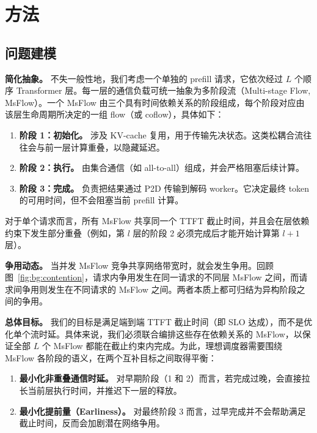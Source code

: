 \section{方法}\label{sec:Methodology}

\subsection{问题建模}\label{sec:Methodology:formulation}

\textbf{简化抽象。} 不失一般性地，我们考虑一个单独的 prefill 请求，它依次经过 $L$ 个顺序 Transformer 层。每一层的通信负载可统一抽象为多阶段流（Multi-stage Flow, MsFlow）。一个 MsFlow 由三个具有时间依赖关系的阶段组成，每个阶段对应由该层生命周期所决定的一组 flow（或 coflow），具体如下：
\begin{enumerate}[label=$\bullet$,leftmargin=*,itemsep=0.5pt]
\item \textbf{阶段 1：初始化。} 涉及 KV-cache 复用，用于传输先决状态。这类松耦合流往往会与前一层计算重叠，以隐藏延迟。
\item \textbf{阶段 2：执行。} 由集合通信（如 all-to-all）组成，并会严格阻塞后续计算。
\item \textbf{阶段 3：完成。} 负责把结果通过 P2D 传输到解码 worker。它决定最终 token 的可用时间，但不会阻塞当前 prefill 计算。
\end{enumerate}

对于单个请求而言，所有 MsFlow 共享同一个 TTFT 截止时间，并且会在层依赖约束下发生部分重叠（例如，第 $l$ 层的阶段 2 必须完成后才能开始计算第 $l+1$ 层）。

\textbf{争用动态。} 当并发 MsFlow 竞争共享网络带宽时，就会发生争用。回顾图~\ref{fig:bg:contention}，请求内争用发生在同一请求的不同层 MsFlow 之间，而请求间争用则发生在不同请求的 MsFlow 之间。两者本质上都可归结为异构阶段之间的争用。

\textbf{总体目标。} 我们的目标是满足端到端 TTFT 截止时间（即 SLO 达成），而不是优化单个流时延。具体来说，我们必须联合编排这些存在依赖关系的 MsFlow，以保证全部 $L$ 个 MsFlow 都能在截止约束内完成。为此，理想调度器需要围绕 MsFlow 各阶段的语义，在两个互补目标之间取得平衡：
\begin{enumerate}[label=(\roman*),leftmargin=*,itemsep=0.5pt]
    \item \textbf{最小化非重叠通信时延。} 对早期阶段（1 和 2）而言，若完成过晚，会直接拉长当前层执行时间，并推迟下一层的释放。
    \item \textbf{最小化提前量（Earliness）。} 对最终阶段 3 而言，过早完成并不会帮助满足截止时间，反而会加剧潜在网络争用。
\end{enumerate}


